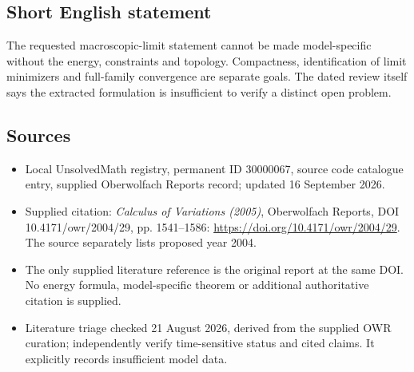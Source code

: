 \documentclass[11pt]{article}
\begin{document}
\subsection{Short English statement}
The requested macroscopic-limit statement cannot be made model-specific without the energy, constraints and topology. Compactness, identification of limit minimizers and full-family convergence are separate goals. The dated review itself says the extracted formulation is insufficient to verify a distinct open problem.
\subsection{Sources}
\begin{itemize}
\item Local UnsolvedMath registry, permanent ID 30000067, source code catalogue entry, supplied Oberwolfach Reports record; updated 16 September 2026.
\item Supplied citation: \emph{Calculus of Variations (2005)}, Oberwolfach Reports, DOI 10.4171/owr/2004/29, pp. 1541--1586: \url{https://doi.org/10.4171/owr/2004/29}. The source separately lists proposed year 2004.
\item The only supplied literature reference is the original report at the same DOI. No energy formula, model-specific theorem or additional authoritative citation is supplied.
\item Literature triage checked 21 August 2026, derived from the supplied OWR curation; independently verify time-sensitive status and cited claims. It explicitly records insufficient model data.
\end{itemize}
\end{document}

